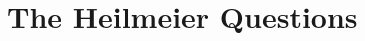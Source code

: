
\section{The Heilmeier Questions}

\begingroup
\renewcommand{\labelenumi}{\textbf{Q\arabic{enumi}.}}
